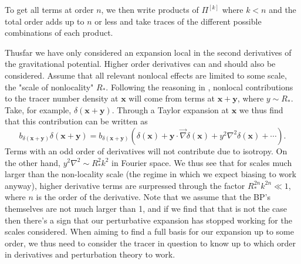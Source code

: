 \documentclass[11pt]{article}
\DeclareRobustCommand{\d}{\ifmmode\text{d}\else d\fi}
\newcommand{\br}[1]{\ensuremath{\left( #1 \right)}}
\newcommand{\sbr}[1]{\ensuremath{\left[ #1 \right]}}
\begin{document}
To get all terms at order $n$, we then write products of $\Pi^{[k]}$ where $k<n$ and the total order adds up to $n$ or less and take traces of the different possible combinations of each product. %

Thusfar we have only considered an expansion local in the second derivatives of the gravitational potential. Higher order derivatives can and should also be considered. Assume that all relevant nonlocal effects are limited to some scale, the "scale of nonlocality" $R_*$. Following the reasoning in \cite{Schmidt2013_clustering}, nonlocal contributions to the tracer number density at $\mathbf x$ will come from terms at $\mathbf x + \mathbf y$, where $y \sim R_*$. Take, for example, $\delta(\mathbf x + \mathbf y)$. Through a Taylor expansion at $\mathbf x$ we thus find that this contribution can be written as
$$
b_{\delta(\mathbf x + \mathbf y)}\delta(\mathbf x+\mathbf y) = b_{\delta(\mathbf x + \mathbf y)}(\delta(\mathbf x) + \mathbf y \cdot\vec \nabla \delta(\mathbf x) + y^2\nabla^2\delta(\mathbf x) + \cdots).
$$
Terms with an odd order of derivatives will not contribute due to isotropy. On the other hand, $y^2\nabla^2\sim R_*^2 k^2$ in Fourier space. We thus see that for scales much larger than the non-locality scale (the regime in which we expect biasing to work anyway), higher derivative terms are surpressed through the factor $R_*^{2n}k^{2n}\ll 1$, where $n$ is the order of the derivative. Note that we assume that the BP's themselves are not much larger than 1, and if we find that that is not the case then there's a sign that our perturbative expansion has stopped working for the scales considered. When aiming to find a full basis for our expansion up to some order, we thus need to consider the tracer in question to know up to which order in derivatives and perturbation theory to work. %

\end{document}
